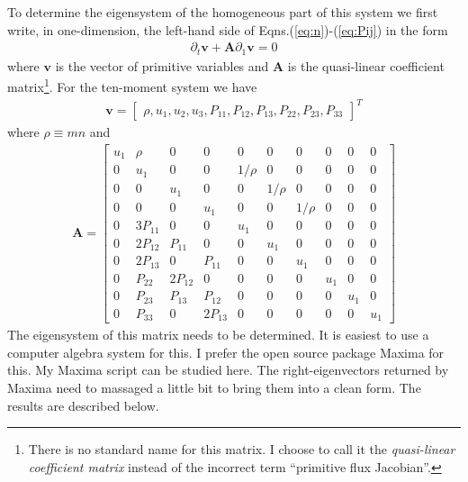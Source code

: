 \documentclass[11pt, reqno]{amsart}
\newcommand{\mvec}[1]{\mathbf{#1}}
\theoremstyle{definition}
\begin{document}
To determine the eigensystem of the homogeneous part of this system we
first write, in one-dimension, the left-hand side of
Eqns.\thinspace(\ref{eq:n})-(\ref{eq:Pij}) in the form
\begin{align}
  \partial_t{\mvec{v}} + \mvec{A}\partial_{1}{\mvec{v}} = 0
\end{align}
where $\mvec{v}$ is the vector of primitive variables and $\mvec{A}$
is the quasi-linear coefficient matrix\footnote{There is no standard
  name for this matrix. I choose to call it the \emph{quasi-linear
    coefficient matrix} instead of the incorrect term ``primitive flux
  Jacobian''.}. For the ten-moment system we have
\begin{align}
  \mvec{v} = 
    \left[
    \begin{matrix}
      \rho,
      u_1,
      u_2,
      u_3,
      P_{11},
      P_{12},
      P_{13},
      P_{22},
      P_{23},
      P_{33}
    \end{matrix}
  \right]^T
\end{align}
where $\rho \equiv mn$ and 
\begin{align}
  \mvec{A} = 
    \left[
    \begin{matrix}
      u_1  & \rho   & 0      & 0     & 0     & 0     & 0      & 0    & 0    & 0 \\
      0    & u_1    & 0      & 0     & 1/\rho & 0     & 0     & 0    & 0    & 0 \\
      0    & 0      & u_1    & 0     & 0     & 1/\rho & 0     & 0    & 0    & 0 \\
      0    & 0      & 0      & u_1   & 0     & 0     & 1/\rho & 0    & 0    & 0 \\
      0    & 3P_{11} & 0      & 0     & u_1   & 0     & 0      & 0    & 0    & 0 \\
      0    & 2P_{12} & P_{11} & 0     & 0    & u_1    & 0      & 0    & 0    & 0 \\
      0    & 2P_{13} & 0      & P_{11} & 0    & 0      & u_1    & 0    & 0    & 0 \\
      0    & P_{22}  & 2P_{12} & 0     & 0    & 0      & 0     & u_1   & 0    & 0 \\
      0    & P_{23}  & P_{13}  & P_{12} & 0    & 0      & 0     & 0     & u_1  & 0 \\
      0    & P_{33}  & 0      & 2P_{13} & 0   & 0      & 0     & 0     & 0    & u_1
    \end{matrix}
  \right]
\end{align}
The eigensystem of this matrix needs to be determined. It is easiest
to use a computer algebra system for this. I prefer the open source
package Maxima for this. My Maxima script can be studied here. The
right-eigenvectors returned by Maxima need to massaged a little bit to
bring them into a clean form. The results are described below.
\end{document}
